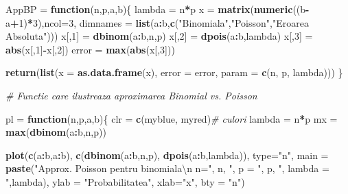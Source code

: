 \documentclass[]{article}
\newenvironment{Shaded}{\begin{snugshade}}{\end{snugshade}}
\newcommand{\KeywordTok}[1]{\textcolor[rgb]{0.13,0.29,0.53}{\textbf{#1}}}
\newcommand{\DataTypeTok}[1]{\textcolor[rgb]{0.13,0.29,0.53}{#1}}
\newcommand{\DecValTok}[1]{\textcolor[rgb]{0.00,0.00,0.81}{#1}}
\newcommand{\CharTok}[1]{\textcolor[rgb]{0.31,0.60,0.02}{#1}}
\newcommand{\StringTok}[1]{\textcolor[rgb]{0.31,0.60,0.02}{#1}}
\newcommand{\CommentTok}[1]{\textcolor[rgb]{0.56,0.35,0.01}{\textit{#1}}}
\newcommand{\ControlFlowTok}[1]{\textcolor[rgb]{0.13,0.29,0.53}{\textbf{#1}}}
\newcommand{\OperatorTok}[1]{\textcolor[rgb]{0.81,0.36,0.00}{\textbf{#1}}}
\newcommand{\NormalTok}[1]{#1}
\begin{document}
\begin{Shaded}
\begin{Highlighting}[]
\NormalTok{AppBP =}\StringTok{ }\ControlFlowTok{function}\NormalTok{(n,p,a,b)\{}
\NormalTok{    lambda =}\StringTok{ }\NormalTok{n}\OperatorTok{*}\NormalTok{p}
\NormalTok{    x =}\StringTok{ }\KeywordTok{matrix}\NormalTok{(}\KeywordTok{numeric}\NormalTok{((b}\OperatorTok{-}\NormalTok{a}\OperatorTok{+}\DecValTok{1}\NormalTok{)}\OperatorTok{*}\DecValTok{3}\NormalTok{),}\DataTypeTok{ncol=}\DecValTok{3}\NormalTok{,}
               \DataTypeTok{dimnames =} \KeywordTok{list}\NormalTok{(a}\OperatorTok{:}\NormalTok{b,}\KeywordTok{c}\NormalTok{(}\StringTok{"Binomiala"}\NormalTok{,}\StringTok{"Poisson"}\NormalTok{,}\StringTok{"Eroarea Absoluta"}\NormalTok{)))}
\NormalTok{    x[,}\DecValTok{1}\NormalTok{] =}\StringTok{ }\KeywordTok{dbinom}\NormalTok{(a}\OperatorTok{:}\NormalTok{b,n,p)}
\NormalTok{    x[,}\DecValTok{2}\NormalTok{] =}\StringTok{ }\KeywordTok{dpois}\NormalTok{(a}\OperatorTok{:}\NormalTok{b,lambda)}
\NormalTok{    x[,}\DecValTok{3}\NormalTok{] =}\StringTok{ }\KeywordTok{abs}\NormalTok{(x[,}\DecValTok{1}\NormalTok{]}\OperatorTok{-}\NormalTok{x[,}\DecValTok{2}\NormalTok{])}
\NormalTok{    error =}\StringTok{ }\KeywordTok{max}\NormalTok{(}\KeywordTok{abs}\NormalTok{(x[,}\DecValTok{3}\NormalTok{]))}
    
    \KeywordTok{return}\NormalTok{(}\KeywordTok{list}\NormalTok{(}\DataTypeTok{x =} \KeywordTok{as.data.frame}\NormalTok{(x), }\DataTypeTok{error =}\NormalTok{ error, }\DataTypeTok{param =} \KeywordTok{c}\NormalTok{(n, p, lambda)))}
\NormalTok{\}}

\CommentTok{# Functie care ilustreaza aproximarea Binomial vs. Poisson}

\NormalTok{pl =}\StringTok{ }\ControlFlowTok{function}\NormalTok{(n,p,a,b)\{}
\NormalTok{    clr =}\StringTok{ }\KeywordTok{c}\NormalTok{(myblue, myred)}\CommentTok{# culori}
\NormalTok{    lambda =}\StringTok{ }\NormalTok{n}\OperatorTok{*}\NormalTok{p}
\NormalTok{    mx =}\StringTok{ }\KeywordTok{max}\NormalTok{(}\KeywordTok{dbinom}\NormalTok{(a}\OperatorTok{:}\NormalTok{b,n,p))}
    
    \KeywordTok{plot}\NormalTok{(}\KeywordTok{c}\NormalTok{(a}\OperatorTok{:}\NormalTok{b,a}\OperatorTok{:}\NormalTok{b), }\KeywordTok{c}\NormalTok{(}\KeywordTok{dbinom}\NormalTok{(a}\OperatorTok{:}\NormalTok{b,n,p), }\KeywordTok{dpois}\NormalTok{(a}\OperatorTok{:}\NormalTok{b,lambda)), }\DataTypeTok{type=}\StringTok{"n"}\NormalTok{, }
         \DataTypeTok{main =} \KeywordTok{paste}\NormalTok{(}\StringTok{"Approx. Poisson pentru binomiala}\CharTok{\textbackslash{}n}\StringTok{ n="}\NormalTok{, }
\NormalTok{                      n, }\StringTok{", p = "}\NormalTok{, p, }\StringTok{", lambda = "}\NormalTok{,lambda), }
         \DataTypeTok{ylab =} \StringTok{"Probabilitatea"}\NormalTok{, }\DataTypeTok{xlab=}\StringTok{"x"}\NormalTok{,}
         \DataTypeTok{bty =} \StringTok{"n"}\NormalTok{)}
    

\end{Highlighting}
\end{Shaded}
\end{document}
